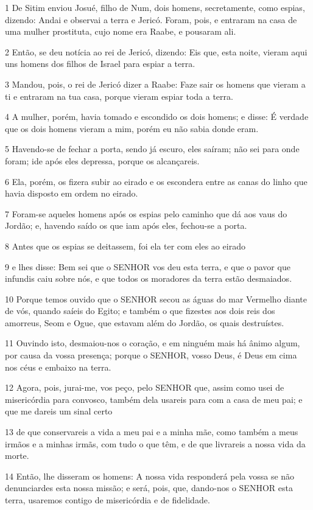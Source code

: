 \par 1 De Sitim enviou Josué, filho de Num, dois homens, secretamente, como espias, dizendo: Andai e observai a terra e Jericó. Foram, pois, e entraram na casa de uma mulher prostituta, cujo nome era Raabe, e pousaram ali.
\par 2 Então, se deu notícia ao rei de Jericó, dizendo: Eis que, esta noite, vieram aqui uns homens dos filhos de Israel para espiar a terra.
\par 3 Mandou, pois, o rei de Jericó dizer a Raabe: Faze sair os homens que vieram a ti e entraram na tua casa, porque vieram espiar toda a terra.
\par 4 A mulher, porém, havia tomado e escondido os dois homens; e disse: É verdade que os dois homens vieram a mim, porém eu não sabia donde eram.
\par 5 Havendo-se de fechar a porta, sendo já escuro, eles saíram; não sei para onde foram; ide após eles depressa, porque os alcançareis.
\par 6 Ela, porém, os fizera subir ao eirado e os escondera entre as canas do linho que havia disposto em ordem no eirado.
\par 7 Foram-se aqueles homens após os espias pelo caminho que dá aos vaus do Jordão; e, havendo saído os que iam após eles, fechou-se a porta.
\par 8 Antes que os espias se deitassem, foi ela ter com eles ao eirado
\par 9 e lhes disse: Bem sei que o SENHOR vos deu esta terra, e que o pavor que infundis caiu sobre nós, e que todos os moradores da terra estão desmaiados.
\par 10 Porque temos ouvido que o SENHOR secou as águas do mar Vermelho diante de vós, quando saíeis do Egito; e também o que fizestes aos dois reis dos amorreus, Seom e Ogue, que estavam além do Jordão, os quais destruístes.
\par 11 Ouvindo isto, desmaiou-nos o coração, e em ninguém mais há ânimo algum, por causa da vossa presença; porque o SENHOR, vosso Deus, é Deus em cima nos céus e embaixo na terra.
\par 12 Agora, pois, jurai-me, vos peço, pelo SENHOR que, assim como usei de misericórdia para convosco, também dela usareis para com a casa de meu pai; e que me dareis um sinal certo
\par 13 de que conservareis a vida a meu pai e a minha mãe, como também a meus irmãos e a minhas irmãs, com tudo o que têm, e de que livrareis a nossa vida da morte.
\par 14 Então, lhe disseram os homens: A nossa vida responderá pela vossa se não denunciardes esta nossa missão; e será, pois, que, dando-nos o SENHOR esta terra, usaremos contigo de misericórdia e de fidelidade.
